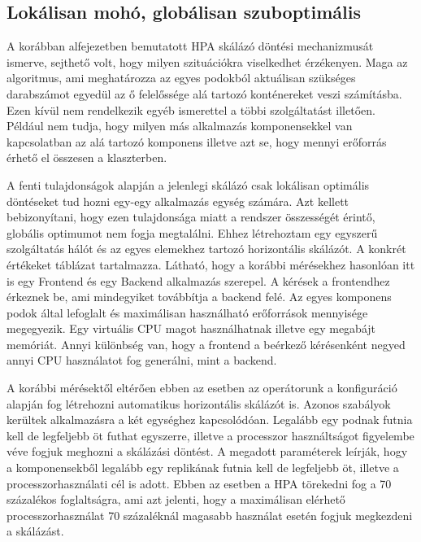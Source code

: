 \subsection{Lokálisan mohó, globálisan szuboptimális}
\label{subsec:first-HPA-measure}

A korábban  alfejezetben bemutatott HPA skálázó döntési mechanizmusát ismerve, sejthető volt, hogy milyen szituációkra viselkedhet érzékenyen.
Maga az algoritmus, ami meghatározza az egyes podokból aktuálisan szükséges darabszámot egyedül az ő felelőssége alá tartozó konténereket veszi számításba.
Ezen kívül nem rendelkezik egyéb ismerettel a többi szolgáltatást illetően.
Például nem tudja, hogy milyen más alkalmazás komponensekkel van kapcsolatban az alá tartozó komponens illetve azt se, hogy mennyi erőforrás érhető el összesen a klaszterben.

A fenti tulajdonságok alapján a jelenlegi skálázó csak lokálisan optimális döntéseket tud hozni egy-egy alkalmazás egység számára.
Azt kellett bebizonyítani, hogy ezen tulajdonsága miatt a rendszer összességét érintő, globális optimumot nem fogja megtalálni.
Ehhez létrehoztam egy egyszerű szolgáltatás hálót és az egyes elemekhez tartozó horizontális skálázót. 
A konkrét értékeket  táblázat tartalmazza.
Látható, hogy a korábbi mérésekhez hasonlóan itt is egy Frontend és egy Backend alkalmazás szerepel. 
A kérések a frontendhez érkeznek be, ami mindegyiket továbbítja a backend felé. 
Az egyes komponens podok által lefoglalt és maximálisan használható erőforrások mennyisége megegyezik.
Egy virtuális CPU magot használhatnak illetve egy megabájt memóriát.
Annyi különbség van, hogy a frontend a beérkező kérésenként negyed annyi CPU használatot fog generálni, mint a backend.

A korábbi mérésektől eltérően ebben az esetben az operátorunk a konfiguráció alapján fog létrehozni automatikus horizontális skálázót is.
Azonos szabályok kerültek alkalmazásra a két egységhez kapcsolódóan.
Legalább egy podnak futnia kell de legfeljebb öt futhat egyszerre, illetve a processzor használtságot figyelembe véve fogjuk meghozni a skálázási döntést.
A megadott paraméterek leírják, hogy a komponensekből legalább egy replikának futnia kell de legfeljebb öt, illetve a processzorhasználati cél is adott.
Ebben az esetben a HPA törekedni fog a 70 százalékos foglaltságra, ami azt jelenti, hogy a maximálisan elérhető processzorhasználat 70 százaléknál magasabb használat esetén fogjuk megkezdeni a skálázást.

